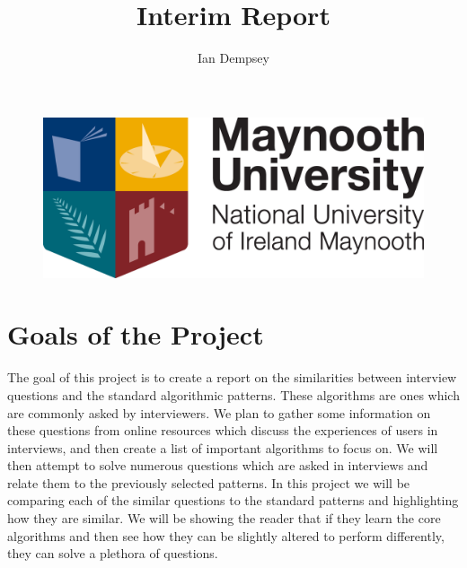 \documentclass{article}
\title{Interim Report}
\author{Ian Dempsey}
\begin{document}
\begin{titlepage}
\maketitle
\begin{figure}[h]
\includegraphics{MU.png}
\end{figure} 
\end{titlepage}
\section{Goals of the Project}
The goal of this project is to create a report on the similarities between interview questions and the standard algorithmic patterns. These algorithms are ones which are commonly asked by interviewers. We plan to gather some information on these questions from online resources which discuss the experiences of users in interviews, and then create a list of important algorithms to focus on. We will then attempt to solve numerous questions which are asked in interviews and relate them to the previously selected patterns. In this project we will be comparing each of the similar questions to the standard patterns and highlighting how they are similar. We will be showing the reader that if they learn the core algorithms and then see how they can be slightly altered to perform differently, they can solve a plethora of questions.
\end{document}
